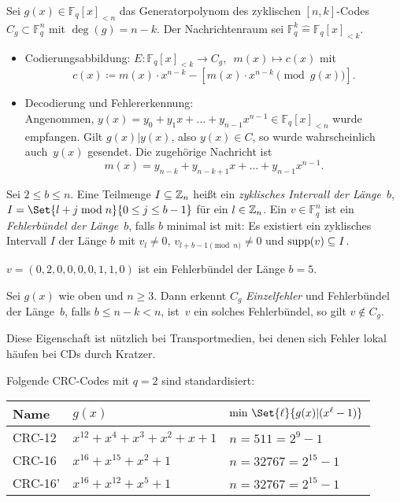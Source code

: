 \documentclass{cheat-sheet}
\newcommand{\F}{\mathbb{F}} %
\newcommand{\divides}{|} %
\begin{document}
\begin{verf}
  Sei $g(x) \in \F_q[x]_{< n}$ das Generatorpolynom des zyklischen $[n, k]$-Codes $C_g \subset \F_q^n$ mit $\deg(g) = n - k$.
  Der Nachrichtenraum sei $\F_q^k \hat{=} \F_q[x]_{< k}$.
  \begin{itemize}
    \item Codierungsabbildung: \enspace $E : \F_q[x]_{< k} \to C_g, \enspace m(x) \mapsto c(x)$ \enspace mit
    \[
      c(x) \coloneqq m(x) \cdot x^{n-k} - [ m(x) \cdot x^{n-k} \pmod{g(x)} ].
    \]
    \item Decodierung und Fehlererkennung: \\
    Angenommen, $y(x) = y_0 + y_1 x + \ldots + y_{n-1} x^{n-1} \in \F_q[x]_{< n}$ wurde empfangen.
    Gilt $g(x) \divides y(x)$, also $y(x) \in C$, so wurde wahrscheinlich auch~$y(x)$ gesendet.
    Die zugehörige Nachricht ist
    \[
      m(x) = y_{n-k} + y_{n-k+1} x + \ldots + y_{n-1} x^{n-1}.
    \]
  \end{itemize}
\end{verf}

\begin{defn}
  Sei $2 \leq b \leq n$.
  Eine Teilmenge $I \subseteq \mathbb{Z}_n$ heißt ein \emph{zyklisches Intervall der Länge~$b$}, \dh{} $I= \Set{l + j \bmod n}{0 \leq j \leq b-1}$ für ein $l \in \mathbb{Z}_n$.
  Ein $v \in \F_q^n$ ist ein \emph{Fehlerbündel der Länge~$b$}, falls $b$ minimal ist mit:
  Es existiert ein zyklisches Intervall $I$ der Länge $b$ mit $v_l \neq 0$, $v_{l+b-1 \pmod{n}} \neq 0$ und $\operatorname{supp}(v) \subseteq I$.
\end{defn}

\begin{bsp}
  $v = (0,2,0,0,0,0,1,1,0)$ ist ein Fehlerbündel der Länge $b = 5$.
\end{bsp}

\begin{prop}
  Sei $g(x)$ wie oben und $n \geq 3$.
  Dann erkennt $C_g$ \textit{Einzelfehler} und Fehlerbündel der Länge~$b$, falls $b \leq n - k < n$, \dh{} ist~$v$ ein solches Fehlerbündel, so gilt $v \not\in C_g$.
\end{prop}

\begin{bem}
  Diese Eigenschaft ist nützlich bei Transportmedien, bei denen sich Fehler lokal häufen \zB{} bei CDs durch Kratzer.
\end{bem}

\begin{bspe}
  Folgende CRC-Codes mit $q = 2$ sind standardisiert:

  \begin{tabular}{l | l | l}
    Name & $g(x)$ & $\min \, \Set{\ell}{g(x) \divides (x^\ell - 1)}$ \\ \hline
    CRC-12 & $x^{12} + x^4 + x^3 + x^2 + x + 1$ & $n = 511 = 2^9 - 1$ \\
    CRC-16 & $x^{16} + x^{15} + x^2 + 1$ & $n = 32767 = 2^{15} - 1$ \\
    CRC-16' & $x^{16} + x^{12} + x^5 + 1$ & $n = 32767 = 2^{15} - 1$
  \end{tabular}
\end{bspe}
\end{document}
